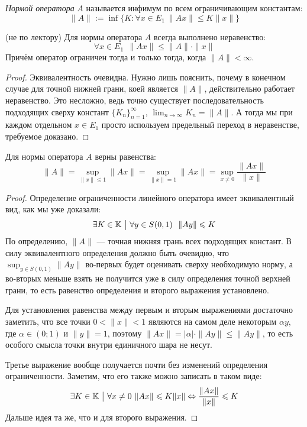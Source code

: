 \begin{definition}
	\textit{Нормой оператора} $A$ называется инфимум по всем ограничивающим константам:
	\[
		\|A\| := \inf \{K \colon \forall x \in E_1\ \|Ax\| \le K\|x\|\}
	\]
\end{definition}

\begin{proposition} (не по лектору)
	Для нормы оператора $A$ всегда выполнено неравенство:
	\[
		\forall x \in E_1\ \ \|Ax\| \le \|A\| \cdot \|x\|
	\]
	Причём оператор ограничен тогда и только тогда, когда $\|A\| < \infty$.
\end{proposition}

\begin{proof}
	Эквивалентность очевидна. Нужно лишь пояснить, почему в конечном случае для точной нижней грани, коей является $\|A\|$, действительно работает неравенство. Это несложно, ведь точно существует последовательность подходящих сверху констант $\{K_n\}_{n = 1}^\infty$, $\lim_{n \to \infty} K_n = \|A\|$. А тогда мы при каждом отдельном $x \in E_1$ просто используем предельный переход в неравенстве, требуемое доказано.
\end{proof}

\begin{proposition}
	Для нормы оператора $A$ верны равенства:
	\[
		\|A\| = \sup_{\|x\| \le 1} \|Ax\| = \sup_{\|x\| = 1} \|Ax\| = \sup_{x \neq 0} \frac{\|Ax\|}{\|x\|}
	\]
\end{proposition}

\begin{proof}
	Определение ограниченности линейного оператора имеет эквивалентный вид, как мы уже доказали:
	\[
		\exists K \in \K \such \forall y \in S(0, 1)\ \ \|Ay\| \le K
	\]
	По определению, $\|A\|$ --- точная нижняя грань всех подходящих констант. В силу эквивалентного определения должно быть очевидно, что $\sup_{y \in S(0, 1)} \|Ay\|$ во-первых будет оценивать сверху необходимую норму, а во-вторых меньше взять не получится уже в силу определения точной верхней грани, то есть равенство определения и второго выражения установлено.
	
	Для установления равенства между первым и вторым выражениями достаточно заметить, что все точки $0 < \|x\| < 1$ являются на самом деле некоторым $\alpha y$, где $\alpha \in (0; 1)$ и $\|y\| = 1$, поэтому $\|Ax\| = |\alpha| \cdot \|Ay\| \le \|Ay\|$, то есть особого смысла точки внутри единичного шара не несут.
	
	Третье выражение вообще получается почти без изменений определения ограниченности. Заметим, что его также можно записать в таком виде:
	\[
		\exists K \in \K \such \forall x \neq 0\ \|Ax\| \le K\|x\| \Lra \frac{\|Ax\|}{\|x\|} \le K
	\]
	Дальше идея та же, что и для второго выражения.
\end{proof}

